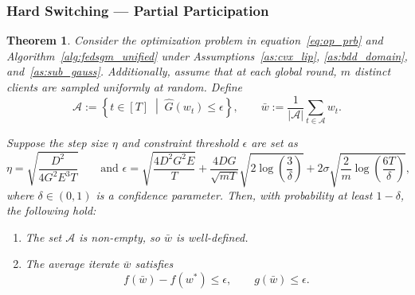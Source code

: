 \documentclass{article} %
\newtheorem{theorem}{Theorem}[]
\def\eqref#1{equation~\ref{#1}}
\begin{document}
\subsubsection{Hard Switching --- Partial Participation}
\begin{theorem}
Consider the optimization problem in \eqref{eq:op_prb} and Algorithm~\ref{alg:fedsgm_unified} under Assumptions~\ref{as:cvx_lip}, \ref{as:bdd_domain}, and~\ref{as:sub_gauss}. Additionally, assume that at each global round, $m$ distinct clients are sampled uniformly at random. Define
\[
\mathcal{A} := \left\{ t \in [T] \;\middle|\; \hat{G}(w_t) \leq \epsilon \right\}, \qquad \bar{w} := \frac{1}{|\mathcal{A}|} \sum_{t \in \mathcal{A}} w_t.
\]

Suppose the step size $\eta$ and constraint threshold $\epsilon$ are set as
\[
\eta = \sqrt{\frac{D^2}{4G^2 E^3 T}}
\qquad \text{and }
\epsilon = \sqrt{\frac{{4 D^2 G^2 E}}{{T}}}
    + \frac{4DG}{\sqrt{mT}}\sqrt{2\log\left(\frac{3}{\delta}\right)}
    +  2\sigma\sqrt{\frac{2}{m} \log\left(\frac{6T}{\delta}\right)},
\]
where $\delta \in (0,1)$ is a confidence parameter. Then, with probability at least $1-\delta$, the following hold:
\begin{enumerate}
    \item The set $\mathcal{A}$ is non-empty, so $\bar{w}$ is well-defined.
    \item The average iterate $\bar{w}$ satisfies
\[
f(\bar{w}) - f(w^*) \leq \epsilon, 
\qquad 
g(\bar{w}) \leq \epsilon.
\]
\end{enumerate}
\end{theorem}
\end{document}
